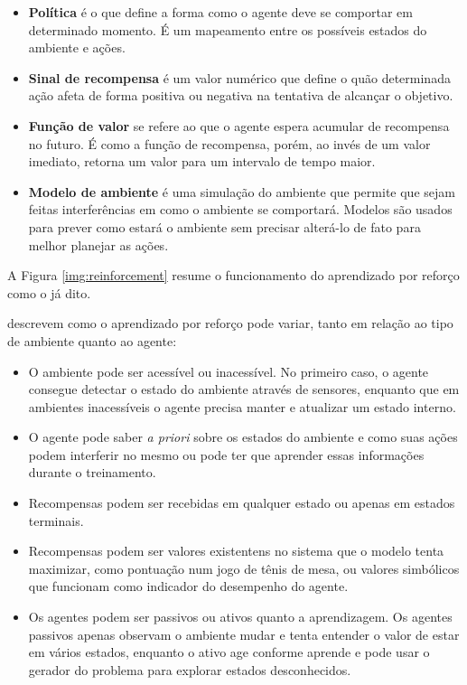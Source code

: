 \begin{itemize}
    \item \textbf{Política} é o que define a forma como o agente deve se comportar em determinado
    momento. É um mapeamento entre os possíveis estados do ambiente e ações.
    
    \item \textbf{Sinal de recompensa} é um valor numérico que define o quão determinada ação afeta
    de forma positiva ou negativa na tentativa de alcançar o objetivo.
    
    \item \textbf{Função de valor} se refere ao que o agente espera acumular de recompensa no
    futuro. É como a função de recompensa, porém, ao invés de um valor imediato, retorna um valor
    para um intervalo de tempo maior.
    
    \item \textbf{Modelo de ambiente} é uma simulação do ambiente que permite  que sejam feitas
    interferências em como o ambiente se comportará. Modelos são usados para prever como estará o
    ambiente sem precisar alterá-lo de fato para melhor planejar as ações.
\end{itemize}

A Figura \ref{img:reinforcement} resume o funcionamento do aprendizado por reforço como o já dito.


 descrevem como o aprendizado por reforço pode variar, tanto em
relação ao tipo de ambiente quanto ao agente:

\begin{itemize}
    \item O ambiente pode ser acessível ou inacessível. No primeiro caso, o agente consegue detectar
    o estado do ambiente através de sensores, enquanto que em ambientes inacessíveis o agente
    precisa manter e atualizar um estado interno.
    
    \item O agente pode saber \textit{a priori} sobre os estados do ambiente e como suas ações podem
    interferir no mesmo ou pode ter que aprender essas informações durante o treinamento.
    
    \item Recompensas podem ser recebidas em qualquer estado ou apenas em estados terminais.
    
    \item Recompensas podem ser valores existentens no sistema que o modelo tenta maximizar, como
    pontuação num jogo de tênis de mesa, ou valores simbólicos que funcionam
    como indicador do desempenho do agente.
    
    \item Os agentes podem ser passivos ou ativos quanto a aprendizagem. Os agentes passivos apenas
    observam o ambiente mudar e tenta entender o valor de estar em vários estados, enquanto o ativo
    age conforme aprende e pode usar o gerador do problema para explorar estados desconhecidos.
\end{itemize}

